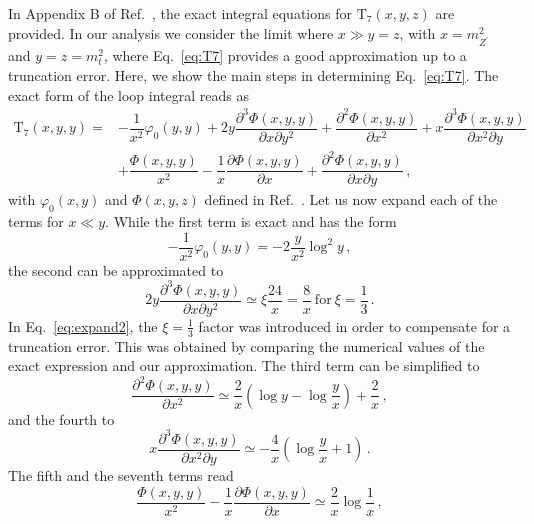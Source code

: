 \documentclass[a4paper,11pt]{article}
\newcommand{\del}{\partial}
\renewcommand{\(}{\left(}
\renewcommand{\)}{\right)}
\renewcommand{\[}{\left[}
\renewcommand{\]}{\right]}
\newcommand{\ro}[1]{\textrm{#1}}
\begin{document}
In Appendix B of Ref.~\cite{Feng:2009gn}, the exact integral equations for $\ro{T}_7\(x,y,z\)$ are provided. 
In our analysis we consider the limit where $x \gg y = z$, with $x = m_{Z^\prime}^2$ and $y = z = m_t^2$, 
where Eq.~\eqref{eq:T7} provides a good approximation up to a truncation error. Here, we show the main steps 
in determining Eq.~\eqref{eq:T7}. The exact form of the loop integral reads as
\begin{equation}
\begin{aligned}
    \ro{T}_7\(x,y,y\) =& -\dfrac{1}{x^2} \varphi_0\(y,y\) + 2 y \dfrac{\del^3 \Phi(x,y,y)}{\del x \del y^2} + \dfrac{\del^2 \Phi(x,y,y)}{\del x^2} + x \dfrac{\del^3 \Phi(x,y,y)}{\del x^2 \del y} \\
    & + \dfrac{\Phi(x,y,y)}{x^2}
    -\dfrac{1}{x} \dfrac{\del \Phi(x,y,y)}{\del x}
    + \dfrac{\del^2 \Phi(x,y,y)}{\del x \del y} \,,
\end{aligned}    
\label{eq:T7-Integrals}
\end{equation}
with $\varphi_0 (x,y)$ and $\Phi(x,y,z)$ defined in Ref.~\cite{Feng:2009gn}. Let us now expand 
each of the terms for $x \ll y$. While the first term is exact and has the form
\begin{equation}
    -\dfrac{1}{x^2} \varphi_0\(y,y\) = -2 \dfrac{y}{x^2} \log^2 y \,,
    \label{eq:expand1}
\end{equation}
the second can be approximated to
\begin{equation}
    2 y \dfrac{\del^3 \Phi(x,y,y)}{\del x \del y^2} \simeq \xi \dfrac{24}{x} = \dfrac{8}{x} ~\textrm{for}~ \xi = \dfrac{1}{3}\,.
    \label{eq:expand2}
\end{equation}
In Eq.~\eqref{eq:expand2}, the $\xi = \tfrac{1}{3}$ factor was introduced in order to compensate for a truncation error. This was obtained by comparing the numerical values of the exact expression and our approximation. The third term can be simplified to
\begin{equation}
    \dfrac{\del^2 \Phi(x,y,y)}{\del x^2} \simeq \dfrac{2}{x} \( \log y - \log \dfrac{y}{x} \) + \dfrac{2}{x} \,,
    \label{eq:expand3}
\end{equation}
and the fourth to
\begin{equation}
    x \dfrac{\del^3 \Phi(x,y,y)}{\del x^2 \del y} \simeq -\dfrac{4}{x}\(\log \dfrac{y}{x} + 1 \)\,.
    \label{eq:expand4}
\end{equation}
The fifth and the seventh terms read
\begin{equation}
    \dfrac{\Phi(x,y,y)}{x^2}
    -\dfrac{1}{x} \dfrac{\del \Phi(x,y,y)}{\del x} \simeq \dfrac{2}{x} \log \dfrac{1}{x} \,,
    \label{eq:expand5}
\end{equation}
\end{document}
